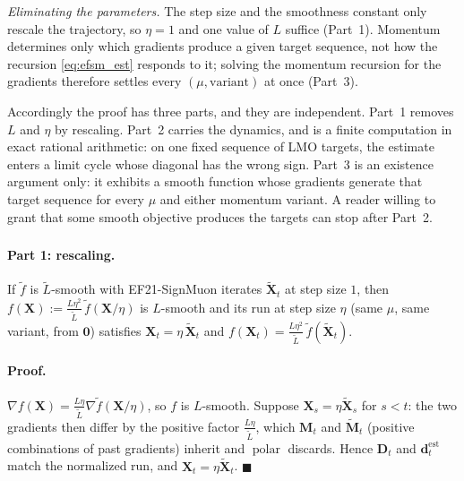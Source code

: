 \emph{Eliminating the parameters.} The step size and the smoothness constant
only rescale the trajectory, so $\eta=1$ and one value of $L$ suffice
(Part~1). Momentum determines only which gradients produce a given target
sequence, not how the recursion \eqref{eq:efsm_est} responds to it; solving
the momentum recursion for the gradients therefore settles every
$(\mu,\text{variant})$ at once (Part~3).

Accordingly the proof has three parts, and they are independent. Part~1
removes $L$ and $\eta$ by rescaling. Part~2 carries the dynamics, and is a
finite computation in exact rational arithmetic: on one fixed sequence of LMO
targets, the estimate enters a limit cycle whose diagonal has the wrong sign.
Part~3 is an existence argument only: it exhibits a smooth function whose
gradients generate that target sequence for every $\mu$ and either momentum
variant. A reader willing to grant that some smooth objective produces the
targets can stop after Part~2.

\subsubsection*{}

\paragraph{Part 1: rescaling.}
\begin{lemma}\label{lem:efsm_reduction}
If $\tilde f$ is $\tilde L$-smooth with EF21-SignMuon iterates
$\tilde{\mathbf X}_t$ at step size $1$, then
$f(\mathbf X):=\tfrac{L\eta^2}{\tilde L}\,\tilde f(\mathbf X/\eta)$ is $L$-smooth
and its run at step size $\eta$ (same $\mu$, same variant, from $\mathbf 0$)
satisfies $\mathbf X_t=\eta\,\tilde{\mathbf X}_t$ and
$f(\mathbf X_t)=\tfrac{L\eta^2}{\tilde L}\,\tilde f(\tilde{\mathbf X}_t)$.
\end{lemma}
\paragraph{Proof.}
$\nabla f(\mathbf X)=\tfrac{L\eta}{\tilde L}\nabla\tilde f(\mathbf X/\eta)$, so
$f$ is $L$-smooth. Suppose $\mathbf X_s=\eta\tilde{\mathbf X}_s$ for $s<t$: the
two gradients then differ by the positive factor $\tfrac{L\eta}{\tilde L}$,
which $\mathbf M_t$ and $\tilde{\mathbf M}_t$ (positive combinations of past
gradients) inherit and $\operatorname{polar}$ discards. Hence $\mathbf D_t$ and
$\mathbf d_t^{\mathrm{est}}$ match the normalized run, and
$\mathbf X_t=\eta\tilde{\mathbf X}_t$. $\blacksquare$

